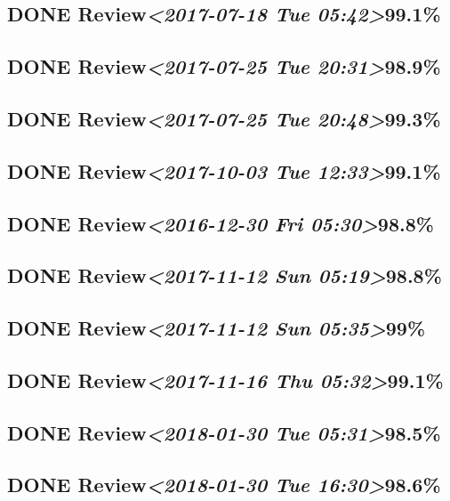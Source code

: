 \documentclass[11pt]{ctexart}
\begin{document}
\subsection{{\bfseries\sffamily DONE} Review\textit{<2017-07-18 Tue 05:42>}99.1\%}
\label{sec:orgae3fbb5}
\subsection{{\bfseries\sffamily DONE} Review\textit{<2017-07-25 Tue 20:31>}98.9\%}
\label{sec:org7152933}
\subsection{{\bfseries\sffamily DONE} Review\textit{<2017-07-25 Tue 20:48>}99.3\%}
\label{sec:org21219ca}
\subsection{{\bfseries\sffamily DONE} Review\textit{<2017-10-03 Tue 12:33>}99.1\%}
\label{sec:orgbd91dbc}
\subsection{{\bfseries\sffamily DONE} Review\textit{<2016-12-30 Fri 05:30>}98.8\%}
\label{sec:org5a59e25}

\subsection{{\bfseries\sffamily DONE} Review\textit{<2017-11-12 Sun 05:19>}98.8\%}
\label{sec:org73f3337}
\subsection{{\bfseries\sffamily DONE} Review\textit{<2017-11-12 Sun 05:35>}99\%}
\label{sec:org91ab53a}
\subsection{{\bfseries\sffamily DONE} Review\textit{<2017-11-16 Thu 05:32>}99.1\%}
\label{sec:org7537f2e}
\subsection{{\bfseries\sffamily DONE} Review\textit{<2018-01-30 Tue 05:31>}98.5\%}
\label{sec:orgcde6e90}
\subsection{{\bfseries\sffamily DONE} Review\textit{<2018-01-30 Tue 16:30>}98.6\%}
\label{sec:orgdf204af}
\end{document}
